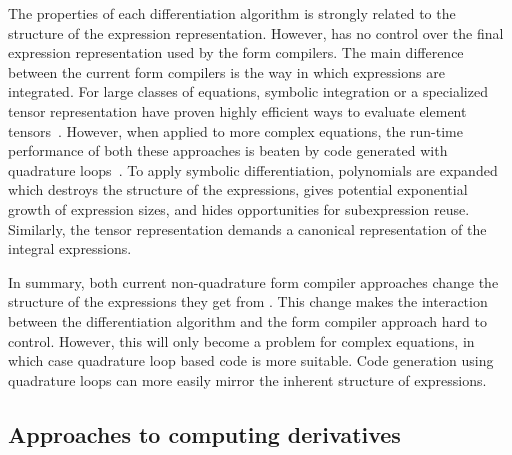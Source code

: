 The properties of each differentiation algorithm is strongly related
to the structure of the expression representation.  However, \ufl{}
has no control over the final expression representation used by the
form compilers.  The main difference between the current form
compilers is the way in which expressions are integrated.  For large
classes of equations, symbolic integration or a specialized tensor
representation have proven highly efficient ways to evaluate element
tensors~\cite{AlnMar2009,KirLog2006,KirLog2007}.  However, when
applied to more complex equations, the run-time performance of both
these approaches is beaten by code generated with quadrature
loops~\cite{AlnMar2009,OelWel2009}.  To apply symbolic
differentiation, polynomials are expanded which destroys the structure
of the expressions, gives potential exponential growth of expression
sizes, and hides opportunities for subexpression reuse.  Similarly,
the tensor representation demands a canonical representation of the
integral expressions.

In summary, both current non-quadrature form compiler approaches
change the structure of the expressions they get from \ufl{}.  This
change makes the interaction between the differentiation algorithm and
the form compiler approach hard to control.  However, this will only
become a problem for complex equations, in which case quadrature loop
based code is more suitable.  Code generation using quadrature loops
can more easily mirror the inherent structure of \ufl{} expressions.






\subsection{Approaches to computing derivatives} \label{ufl:sec:appcompder}

